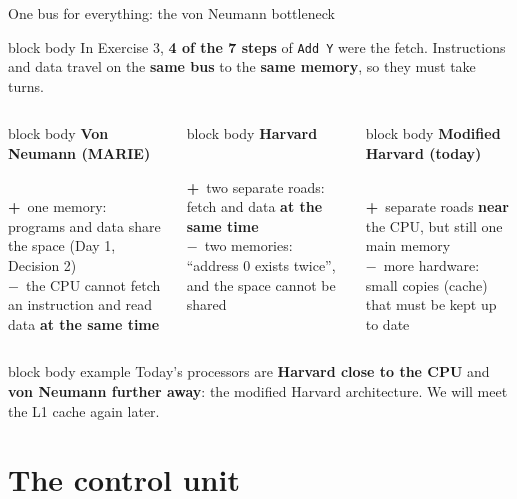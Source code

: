 \documentclass[aspectratio=169,10pt]{beamer}
\newcommand{\optcard}[4]{%
  \begin{beamercolorbox}[rounded=true,sep=0.16cm,wd=\linewidth]{block body}
    \centering\small\textbf{#1}\\[0.1cm]
    #2\\[0.1cm]
    \raggedright\footnotesize
    \textcolor{aExec}{\textbf{+}}\ #3\\[0.06cm]
    \textcolor{aWrite}{\textbf{$-$}}\ #4
  \end{beamercolorbox}}
\newcommand{\keymsg}[1]{%
  \begin{beamercolorbox}[rounded=true,sep=0.1cm,wd=\textwidth]{block body example}
    \centering\footnotesize #1
  \end{beamercolorbox}}
\begin{document}
\begin{frame}{One bus for everything: the von Neumann bottleneck}
  \begin{beamercolorbox}[rounded=true,sep=0.1cm,wd=\textwidth]{block body}
    \centering\footnotesize In Exercise 3, \textbf{4 of the 7 steps} of \texttt{Add Y} were the fetch.
    Instructions and data travel on the \textbf{same bus} to the \textbf{same memory}, so they must take turns.
  \end{beamercolorbox}
  \vspace{0.15cm}
  \begin{columns}[T,onlytextwidth]
      \optcard{Von Neumann (MARIE)}{\diagVN}
        {one memory: programs and data share the space (Day 1, Decision 2)}
        {the CPU cannot fetch an instruction and read data \textbf{at the same time}}
      \optcard{Harvard}{\diagHarv}
        {two separate roads: fetch and data \textbf{at the same time}}
        {two memories: ``address 0 exists twice'', and the space cannot be shared}
      \optcard{Modified Harvard (today)}{\diagModHarv}
        {separate roads \textbf{near} the CPU, but still one main memory}
        {more hardware: small copies (cache) that must be kept up to date}
  \end{columns}
  \vfill
  \keymsg{Today's processors are \textbf{Harvard close to the CPU} and \textbf{von Neumann further away}:
    the modified Harvard architecture. We will meet the L1 cache again later.}
\end{frame}

\section{The control unit}
\end{document}
